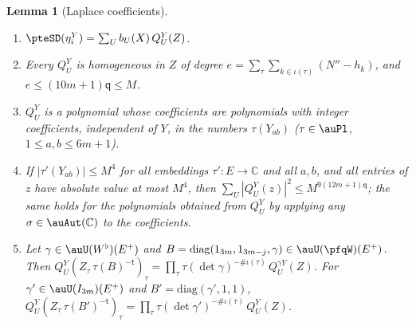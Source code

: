\documentclass[10pt]{amsart}
\newtheorem{lemma}[theorem]{Lemma}
\theoremstyle{definition}
\theoremstyle{remark}
\newcommand{\C}{\mathbb C}
\begin{document}
\begin{lemma}[Laplace coefficients]\label{pfq:Q}
\begin{enumerate}
\item[(Q1)] $\pteSD(\eta^Y_i)=\sum_Ub_U(X)\,Q^Y_U(Z)$.
\item[(Q2)] Every $Q^Y_U$ is homogeneous in $Z$ of degree $e=\sum_\tau\sum_{k\in\iota(\tau)}(N''-h_k)$, and
$e\le(10m+1)\mathsf q\le M$.
\item[(Q3)] $Q^Y_U$ is a polynomial whose coefficients are polynomials with integer coefficients, independent
of $Y$, in the numbers $\tau(Y_{ab})$ ($\tau\in\auPl$, $1\le a,b\le6m+1$).
\item[(Q4)] If $|\tau'(Y_{ab})|\le M^4$ for all embeddings $\tau'\colon E\to\C$ and all $a,b$, and all entries of
$z$ have absolute value at most $M^4$, then $\sum_U|Q^Y_U(z)|^2\le M^{9(12m+1)\mathsf q}$; the same holds for the
polynomials obtained from $Q^Y_U$ by applying any $\sigma\in\auAut(\C)$ to the coefficients.
\item[(Q5)] Let $\gamma\in\auU(W^\flat)(E^+)$ and $B=\mathrm{diag}(1_{3m},1_{3m-j},\gamma)\in\auU(\pfqW)(E^+)$. Then
$Q^Y_U(Z_\tau\,\tau(B)^{-\mathsf t})_\tau=\prod_\tau\tau(\det\gamma)^{-\#\iota(\tau)}\,Q^{\gamma Y}_U(Z)$. For
$\gamma'\in\auU(I_{3m})(E^+)$ and $B'=\mathrm{diag}(\gamma',1,1)$,
$Q^Y_U(Z_\tau\,\tau(B')^{-\mathsf t})_\tau=\prod_\tau\tau(\det\gamma')^{-\#\iota(\tau)}\,Q^Y_U(Z)$.
\end{enumerate}
\end{lemma}
\end{document}
